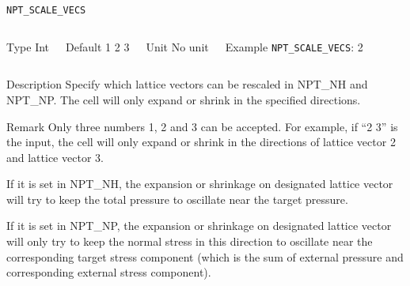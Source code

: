 \begin{frame}[allowframebreaks]{\texttt{NPT\_SCALE\_VECS}} \label{NPT_SCALE_VECS}
\vspace*{-12pt}
\begin{columns}
\begin{block}{Type}
Int
\end{block}

\begin{block}{Default}
1 2 3
\end{block}

\begin{block}{Unit}
No unit
\end{block}

\begin{block}{Example}
\texttt{NPT\_SCALE\_VECS}: 2
\end{block}
\end{columns}

\begin{block}{Description}
Specify which lattice vectors can be rescaled in NPT\_NH and NPT\_NP. The cell will only expand or shrink in the specified directions.

\end{block}

\begin{block}{Remark}
Only three numbers 1, 2 and 3 can be accepted. For example, if ``2 3'' is the input, the cell will only expand or shrink in the directions of lattice vector 2 and lattice vector 3.

If it is set in NPT\_NH, the expansion or shrinkage on designated lattice vector will try to keep the total pressure to oscillate near the target pressure.

If it is set in NPT\_NP, the expansion or shrinkage on designated lattice vector will only try to keep the normal stress in this direction to oscillate near the corresponding target stress component (which is the sum of external pressure and corresponding external stress component).
\end{block}

\end{frame}



